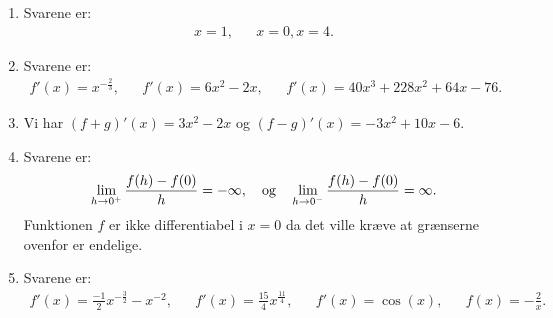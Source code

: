\begin{enumerate}
	\item Svarene er:
	\begin{align*}
	x=1,&& x=0,x=4.
	\end{align*}
	
	\item Svarene er:
	\begin{align*}
	f'(x)=x^{-\frac{2}{3}},&& f'(x)=6x^2-2x,&& f'(x)=40x^3+228x^2+64x-76.
	\end{align*}
	
	\item Vi har $(f+g)'(x)=3x^2-2x$ og $(f-g)'(x)=-3x^2+10x-6$.
	
	\item Svarene er: 
	\begin{align*}
	\lim_{h\to 0^+} \frac{f(h)-f(0)}{h}=-\infty,\quad \textup{og}\quad \lim_{h\to 0^-} \frac{f(h)-f(0)}{h}=\infty.
	\end{align*}
	Funktionen $f$ er ikke differentiabel i $x=0$ da det ville kræve at grænserne ovenfor er endelige.
	
	\item Svarene er:
	\begin{align*}
	f'(x)=\frac{-1}{2}x^{-\frac{3}{2}}-x^{-2},&& f'(x)=\frac{15}{4}x^{\frac{11}{4}},&& f'(x)=\cos(x),&&f(x)=-\frac{2}{x}.
	\end{align*}
	
	


\end{enumerate}
